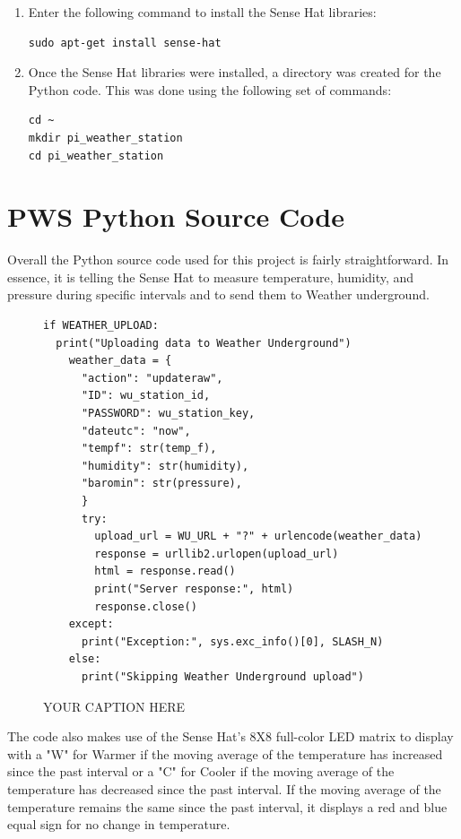 \documentclass[sigconf]{acmart}
\begin{document}
\begin{enumerate}
\item Enter the following command to install the Sense Hat libraries:

\begin{verbatim}
sudo apt-get install sense-hat
\end{verbatim}

\item Once the Sense Hat libraries were installed, a directory was created for the Python code. This was done using the following set of commands:

\begin{verbatim}
cd ~
mkdir pi_weather_station
cd pi_weather_station
\end{verbatim}

\end{enumerate}

\section{PWS Python Source Code}

Overall the Python source code used for this project is fairly straightforward\cite{WundergroundPython2017}. In essence, it is telling the Sense Hat to measure temperature, humidity, and pressure during specific intervals and to send them to Weather underground. 


\begin{figure}[htb]
\begin{verbatim}
if WEATHER_UPLOAD:
  print("Uploading data to Weather Underground")
    weather_data = {
      "action": "updateraw",
      "ID": wu_station_id,
      "PASSWORD": wu_station_key,
      "dateutc": "now",
      "tempf": str(temp_f),
      "humidity": str(humidity),
      "baromin": str(pressure),
      }
      try:
        upload_url = WU_URL + "?" + urlencode(weather_data)
        response = urllib2.urlopen(upload_url)
        html = response.read()
        print("Server response:", html)
        response.close() 
    except:
      print("Exception:", sys.exc_info()[0], SLASH_N)
    else:
      print("Skipping Weather Underground upload")
\end{verbatim}
\caption{YOUR CAPTION HERE}\label{F:upload}
\end{figure}

The code also makes use of the Sense Hat's 8X8 full-color LED matrix to display with a "W" for Warmer if the moving average of the temperature has increased since the past interval or a "C" for Cooler if the moving average of the temperature has decreased since the past interval. If the moving average of the temperature remains the same since the past interval, it displays a red and blue equal sign for no change in temperature. 
\end{document}

